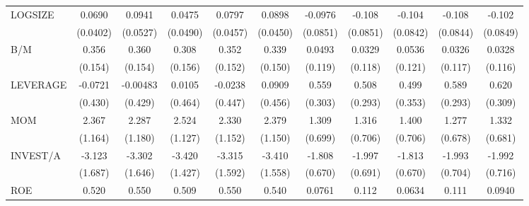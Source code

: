 \begin{table}[htbp]
\begin{tabular}{l*{10}{c}}
LOGSIZE         &   0.0690\sym{*}  &   0.0941\sym{*}  &   0.0475         &   0.0797\sym{*}  &   0.0898\sym{*}  &  -0.0976         &   -0.108         &   -0.104         &   -0.108         &   -0.102         \\
                & (0.0402)         & (0.0527)         & (0.0490)         & (0.0457)         & (0.0450)         & (0.0851)         & (0.0851)         & (0.0842)         & (0.0844)         & (0.0849)         \\
B/M             &    0.356\sym{**} &    0.360\sym{**} &    0.308\sym{*}  &    0.352\sym{**} &    0.339\sym{**} &   0.0493         &   0.0329         &   0.0536         &   0.0326         &   0.0328         \\
                &  (0.154)         &  (0.154)         &  (0.156)         &  (0.152)         &  (0.150)         &  (0.119)         &  (0.118)         &  (0.121)         &  (0.117)         &  (0.116)         \\
LEVERAGE        &  -0.0721         & -0.00483         &   0.0105         &  -0.0238         &   0.0909         &    0.559\sym{*}  &    0.508\sym{*}  &    0.499         &    0.589\sym{**} &    0.620\sym{**} \\
                &  (0.430)         &  (0.429)         &  (0.464)         &  (0.447)         &  (0.456)         &  (0.303)         &  (0.293)         &  (0.353)         &  (0.293)         &  (0.309)         \\
MOM             &    2.367\sym{**} &    2.287\sym{*}  &    2.524\sym{**} &    2.330\sym{**} &    2.379\sym{**} &    1.309\sym{*}  &    1.316\sym{*}  &    1.400\sym{*}  &    1.277\sym{*}  &    1.332\sym{*}  \\
                &  (1.164)         &  (1.180)         &  (1.127)         &  (1.152)         &  (1.150)         &  (0.699)         &  (0.706)         &  (0.706)         &  (0.678)         &  (0.681)         \\
INVEST/A        &   -3.123\sym{*}  &   -3.302\sym{**} &   -3.420\sym{**} &   -3.315\sym{**} &   -3.410\sym{**} &   -1.808\sym{***}&   -1.997\sym{***}&   -1.813\sym{***}&   -1.993\sym{***}&   -1.992\sym{***}\\
                &  (1.687)         &  (1.646)         &  (1.427)         &  (1.592)         &  (1.558)         &  (0.670)         &  (0.691)         &  (0.670)         &  (0.704)         &  (0.716)         \\
ROE             &    0.520         &    0.550         &    0.509         &    0.550         &    0.540         &   0.0761         &    0.112         &   0.0634         &    0.111         &   0.0940         \\

\end{tabular}
\end{table}
